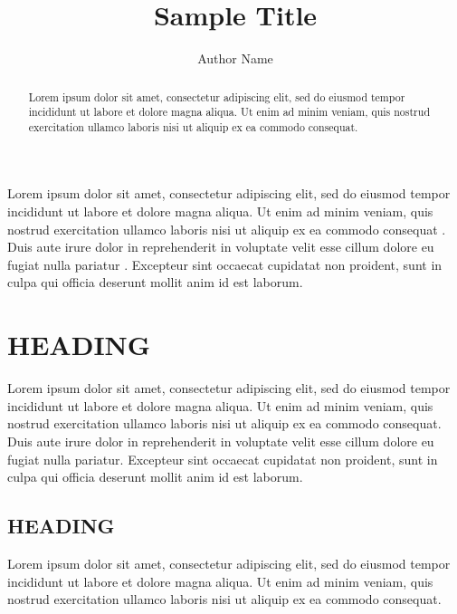 \documentclass[hvmath, online]{copernicus_discussions}
\begin{document}

\title{Sample Title}

\author[1]{Author Name}





\maketitle  

\begin{abstract}
Lorem ipsum dolor sit amet, consectetur adipiscing elit, sed do eiusmod tempor incididunt ut labore et dolore magna aliqua. Ut enim ad minim veniam, quis nostrud exercitation ullamco laboris nisi ut aliquip ex ea commodo consequat. 
\end{abstract}



\introduction[Background]  %
Lorem ipsum dolor sit amet, consectetur adipiscing elit, sed do eiusmod tempor incididunt ut labore et dolore magna aliqua. Ut enim ad minim veniam, quis nostrud exercitation ullamco laboris nisi ut aliquip ex ea commodo consequat \cite{LABEL1}. Duis aute irure dolor in reprehenderit in voluptate velit esse cillum dolore eu fugiat nulla pariatur \cite{LABEL2}. Excepteur sint occaecat cupidatat non proident, sunt in culpa qui officia deserunt mollit anim id est laborum.



\section{HEADING}
Lorem ipsum dolor sit amet, consectetur adipiscing elit, sed do eiusmod tempor incididunt ut labore et dolore magna aliqua. Ut enim ad minim veniam, quis nostrud exercitation ullamco laboris nisi ut aliquip ex ea commodo consequat. Duis aute irure dolor in reprehenderit in voluptate velit esse cillum dolore eu fugiat nulla pariatur. Excepteur sint occaecat cupidatat non proident, sunt in culpa qui officia deserunt mollit anim id est laborum.

\subsection{HEADING}
Lorem ipsum dolor sit amet, consectetur adipiscing elit, sed do eiusmod tempor incididunt ut labore et dolore magna aliqua. Ut enim ad minim veniam, quis nostrud exercitation ullamco laboris nisi ut aliquip ex ea commodo consequat. 
\end{document}
